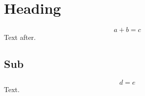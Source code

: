 \documentclass[10pt]{article}
\begin{document}
\section{Heading}
\[ a + b = c \]
Text after.
\subsection{Sub}
\begin{equation} d = e \end{equation}
Text.
\end{document}
